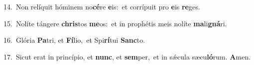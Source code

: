 {\numbfont\textcolor{\numbcolor}{14.}}~Non relíquit hóminem no\-\textbf{cé}\-re \textbf{e}\-is:~\star et corrípuit pro \textbf{e}\-is \textbf{re}\-ges.\par
{\numbfont\textcolor{\numbcolor}{15.}}~Nolíte tángere \textbf{chris}\-tos \textbf{me}\-os:~\star et in prophétis meis nolíte \textbf{ma}\-li\-\textbf{gná}\-ri.\par
{\numbfont\textcolor{\numbcolor}{16.}}~Glória \textbf{Pa}\-tri, et \textbf{Fí}\-lio,~\star et Spi\-\textbf{rí}\-tui \textbf{Sanc}\-to.\par
{\numbfont\textcolor{\numbcolor}{17.}}~Sicut erat in princípio, et \textbf{nunc}\-, et \textbf{sem}\-per,~\star et in sǽcula sæcu\-\textbf{ló}\-rum. \textbf{A}\-men.\par
